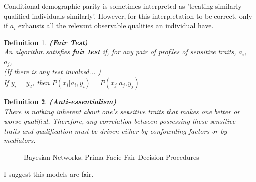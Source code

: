 \documentclass{article}
\newtheorem{definition}{Definition}
\begin{document}
Conditional demographic parity is sometimes interpreted as 'treating similarly qualified individuals similarly'. However, for this interpretation to be correct, only if $a_i$ exhausts all the relevant observable qualities an individual have. 


\begin{definition}
\textup{\textbf{ (Fair Test) } \\
\indent
An algorithm satisfies \textbf{fair test} if, for any pair of profiles of sensitive traits}, $a_i$,  $a_j$, \\
(If there is any test involved... )
\\

\textup{If } $y_i = y_2$\textup{, then } $P(x_i|a_i, y_i) = P(x_j|a_j, y_j)$
\end{definition}


\begin{definition}
\textup{\textbf{ (Anti-essentialism) } \\
There is nothing \textit{inherent} about one’s sensitive traits that makes one better or worse qualified. Therefore, any correlation between possessing these sensitive traits and qualification must be driven either by confounding factors or by mediators.}
\end{definition}





  \begin{figure}[h]
 \caption{Bayesian Networks. Prima Facie Fair Decision Procedures}
  \label{fig:fit}
    \label{fig:my_label}
\end{figure}



I suggest this models are fair.
\end{document}
